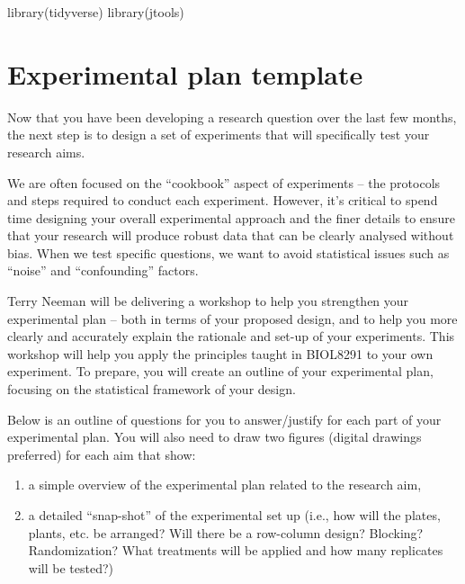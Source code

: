 \documentclass[
]{book}
\newenvironment{Shaded}{\begin{snugshade}}{\end{snugshade}}
\newcommand{\FunctionTok}[1]{\textcolor[rgb]{0.00,0.00,0.00}{#1}}
\newcommand{\NormalTok}[1]{#1}
\begin{document}
\begin{Shaded}
\begin{Highlighting}[]
\FunctionTok{library}\NormalTok{(tidyverse)}
\FunctionTok{library}\NormalTok{(jtools)}
\end{Highlighting}
\end{Shaded}

\hypertarget{experimental-plan-template}{%
\chapter{Experimental plan template}\label{experimental-plan-template}}

Now that you have been developing a research question over the last few months, the next step is to design a set of experiments that will specifically test your research aims.

We are often focused on the ``cookbook'' aspect of experiments -- the protocols and steps required to conduct each experiment. However, it's critical to spend time designing your overall experimental approach and the finer details to ensure that your research will produce robust data that can be clearly analysed without bias. When we test specific questions, we want to avoid statistical issues such as ``noise'' and ``confounding'' factors.

Terry Neeman will be delivering a workshop to help you strengthen your experimental plan -- both in terms of your proposed design, and to help you more clearly and accurately explain the rationale and set-up of your experiments. This workshop will help you apply the principles taught in BIOL8291 to your own experiment. To prepare, you will create an outline of your experimental plan, focusing on the statistical framework of your design.

Below is an outline of questions for you to answer/justify for each part of your experimental plan. You will also need to draw two figures (digital drawings preferred) for each aim that show:

\begin{enumerate}
\def\labelenumi{\arabic{enumi})}
\item
  a simple overview of the experimental plan related to the research aim,
\item
  a detailed ``snap-shot'' of the experimental set up (i.e., how will the plates, plants, etc. be arranged? Will there be a row-column design? Blocking? Randomization? What treatments will be applied and how many replicates will be tested?)
\end{enumerate}
\end{document}
